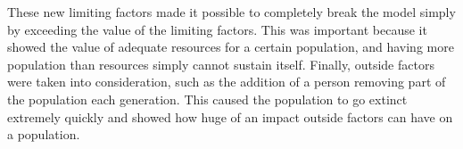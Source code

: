 \documentclass[10pt,letterpaper]{article}
\begin{document}
		\newline \newline
		These new limiting factors made it possible to completely break the model simply by exceeding the value of the limiting factors. This was important because it showed the value of adequate resources for a certain population, and having more population than resources simply cannot sustain itself. 
		\newline \newline
		Finally, outside factors were taken into consideration, such as the addition of a person removing part of the population each generation. This caused the population to go extinct extremely quickly and showed how huge of an impact outside factors can have on a population.
\end{document}
